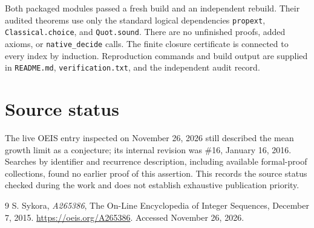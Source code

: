 \documentclass[11pt]{article}
\begin{document}
Both packaged modules passed a fresh build and an independent rebuild. Their audited theorems use only the standard logical dependencies \texttt{propext}, \texttt{Classical.choice}, and \texttt{Quot.sound}. There are no unfinished proofs, added axioms, or \texttt{native\_decide} calls. The finite closure certificate is connected to every index by induction. Reproduction commands and build output are supplied in \texttt{README.md}, \texttt{verification.txt}, and the independent audit record.

\section*{Source status}
The live OEIS entry inspected on November 26, 2026 still described the mean growth limit as a conjecture; its internal revision was \#16, January 16, 2016. Searches by identifier and recurrence description, including available formal-proof collections, found no earlier proof of this assertion. This records the source status checked during the work and does not establish exhaustive publication priority.

\begin{thebibliography}{9}
 S. Sykora, \emph{A265386}, The On-Line Encyclopedia of Integer Sequences, December 7, 2015. \url{https://oeis.org/A265386}. Accessed November 26, 2026.
\end{thebibliography}
\end{document}
